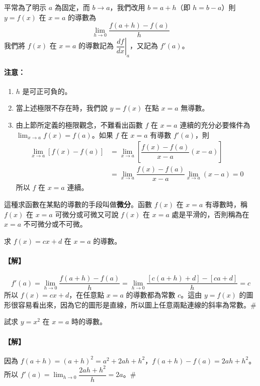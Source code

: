 平常為了明示 $a$ 為固定，而 $b\to a$，我們改用 $b=a+h$（即 $h=b-a$）則 $y=f(x)$ 在 $x=a$ 的導數為
\[ \lim_{h\to 0}\dfrac{f(a+h)-f(a)}{h} \]
我們將 $f(x)$ 在 $x=a$ 的導數記為 $\left.\dfrac{df}{dx}\right|_a$，又記為 $f'(a)$。

\paragraph{注意：}
\begin{enumerate}[label=(\roman*), leftmargin=2em]
  \item $h$ 是可正可負的。
  \item 當上述極限不存在時，我們說 $y=f(x)$ 在點 $x=a$ 無導數。
  \item 由上節所定義的極限觀念，不難看出函數 $f$ 在 $x=a$ 連續的充分必要條件為 $\lim_{x\to a}f(x) = f(a)$。如果 $f$ 在 $x=a$ 有導數 $f'(a)$，則
  \begin{align*}
  \lim_{x\to a}[f(x)-f(a)] &= \lim_{x\to a}\left[\dfrac{f(x)-f(a)}{x-a}(x-a)\right] \\
  &= \lim_{x\to a}\dfrac{f(x)-f(a)}{x-a}\lim_{x\to a}(x-a) = 0
  \end{align*}
  所以 $f$ 在 $x=a$ 連續。
\end{enumerate}

這種求函數在某點的導數的手段叫做\textbf{微分}。函數 $f(x)$ 在 $x=a$ 有導數時，稱 $f(x)$ 在 $x=a$ 可微分或可微又可說 $f(x)$ 在 $x=a$ 處是平滑的，否則稱為在 $x=a$ 不可微分或不可微。

\begin{example}\label{ex:b6-app4-7}
求 $f(x)=cx+d$ 在 $x=a$ 的導數。
\end{example}

\paragraph{【解】}
\[ f'(a) = \lim_{h\to 0}\dfrac{f(a+h)-f(a)}{h} = \lim_{h\to 0}\dfrac{[c(a+h)+d]-[ca+d]}{h} = c \]
所以 $f(x)=cx+d$，在任意點 $x=a$ 的導數都為常數 $c$。這由 $y=f(x)$ 的圖形很容易看出來，因為它的圖形是直線，所以圖上任意兩點連線的斜率為常數。\hfill$\#$

\begin{example}\label{ex:b6-app4-8}
試求 $y=x^2$ 在 $x=a$ 時的導數。
\end{example}

\paragraph{【解】}
因為 $f(a+h) = (a+h)^2 = a^2+2ah+h^2$，$f(a+h)-f(a) = 2ah+h^2$。
所以 $f'(a) = \lim_{h\to 0}\dfrac{2ah+h^2}{h} = 2a$。\hfill$\#$

